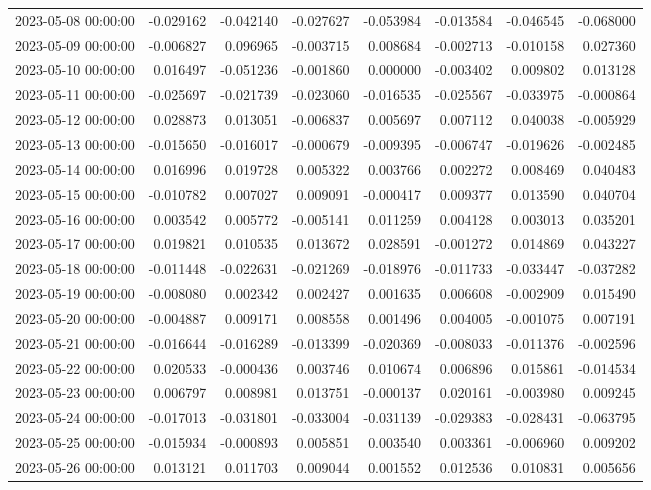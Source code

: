 \begin{tabular}{lrrrrrrr}
2023-05-08 00:00:00 & -0.029162 & -0.042140 & -0.027627 & -0.053984 & -0.013584 & -0.046545 & -0.068000 \\
2023-05-09 00:00:00 & -0.006827 & 0.096965 & -0.003715 & 0.008684 & -0.002713 & -0.010158 & 0.027360 \\
2023-05-10 00:00:00 & 0.016497 & -0.051236 & -0.001860 & 0.000000 & -0.003402 & 0.009802 & 0.013128 \\
2023-05-11 00:00:00 & -0.025697 & -0.021739 & -0.023060 & -0.016535 & -0.025567 & -0.033975 & -0.000864 \\
2023-05-12 00:00:00 & 0.028873 & 0.013051 & -0.006837 & 0.005697 & 0.007112 & 0.040038 & -0.005929 \\
2023-05-13 00:00:00 & -0.015650 & -0.016017 & -0.000679 & -0.009395 & -0.006747 & -0.019626 & -0.002485 \\
2023-05-14 00:00:00 & 0.016996 & 0.019728 & 0.005322 & 0.003766 & 0.002272 & 0.008469 & 0.040483 \\
2023-05-15 00:00:00 & -0.010782 & 0.007027 & 0.009091 & -0.000417 & 0.009377 & 0.013590 & 0.040704 \\
2023-05-16 00:00:00 & 0.003542 & 0.005772 & -0.005141 & 0.011259 & 0.004128 & 0.003013 & 0.035201 \\
2023-05-17 00:00:00 & 0.019821 & 0.010535 & 0.013672 & 0.028591 & -0.001272 & 0.014869 & 0.043227 \\
2023-05-18 00:00:00 & -0.011448 & -0.022631 & -0.021269 & -0.018976 & -0.011733 & -0.033447 & -0.037282 \\
2023-05-19 00:00:00 & -0.008080 & 0.002342 & 0.002427 & 0.001635 & 0.006608 & -0.002909 & 0.015490 \\
2023-05-20 00:00:00 & -0.004887 & 0.009171 & 0.008558 & 0.001496 & 0.004005 & -0.001075 & 0.007191 \\
2023-05-21 00:00:00 & -0.016644 & -0.016289 & -0.013399 & -0.020369 & -0.008033 & -0.011376 & -0.002596 \\
2023-05-22 00:00:00 & 0.020533 & -0.000436 & 0.003746 & 0.010674 & 0.006896 & 0.015861 & -0.014534 \\
2023-05-23 00:00:00 & 0.006797 & 0.008981 & 0.013751 & -0.000137 & 0.020161 & -0.003980 & 0.009245 \\
2023-05-24 00:00:00 & -0.017013 & -0.031801 & -0.033004 & -0.031139 & -0.029383 & -0.028431 & -0.063795 \\
2023-05-25 00:00:00 & -0.015934 & -0.000893 & 0.005851 & 0.003540 & 0.003361 & -0.006960 & 0.009202 \\
2023-05-26 00:00:00 & 0.013121 & 0.011703 & 0.009044 & 0.001552 & 0.012536 & 0.010831 & 0.005656 \\

\end{tabular}
